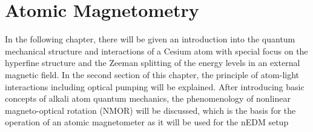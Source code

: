 \chapter{Atomic Magnetometry\label{ch:magnetometry}}
\small

 In the following chapter, there will be given an introduction into the quantum mechanical
structure and interactions of a Cesium atom with special focus on the hyperfine structure and the Zeeman splitting of the energy levels in an external magnetic field. In the second section of this chapter, the principle of atom-light interactions including optical pumping
will be explained. After introducing basic concepts of alkali atom quantum mechanics, the phenomenology of nonlinear magneto-optical rotation (NMOR) will be discussed, which is the basis for the operation of an atomic magnetometer as it will be used for the nEDM setup

